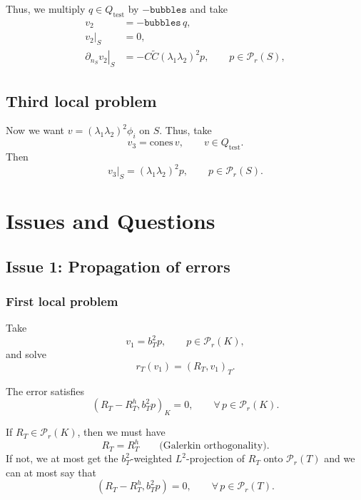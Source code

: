 \documentclass[12pt,a4paper]{article}
\newcommand{\PP}{\mathcal{P}}
\newcommand{\qtest}{Q_{\mathrm{test}}}
\newcommand{\cones}{\mathrm{cones}}
\newcommand{\bubbles}{\texttt{bubbles}}
\begin{document}
Thus, we multiply $q\in\qtest$ by $-\bubbles$ and take
\begin{align}
    v_2&=-\bubbles\,q,\\
    v_2|_S&=0,\\
    \left.\partial_{n_S}v_2\right|_S
       &= - C \tilde C(\lambda_1\lambda_2)^2p,
              \qquad p\in\PP_r(S),
\end{align}

\subsection{Third local problem}
Now we want $v=(\lambda_1\lambda_2)^2\phi_i$ on $S$.
Thus, take
\begin{equation}
    v_3=\cones\,v,
    \qquad v\in\qtest.
\end{equation}
Then
\begin{equation}
    v_3|_S=(\lambda_1\lambda_2)^2p,
        \qquad p\in\PP_r(S).
\end{equation}

\newpage
\section{Issues and Questions}
\subsection{Issue 1: Propagation of errors}

\subsubsection*{First local problem}
Take
\begin{equation}
    v_1=b_T^2p,\qquad p\in\PP_r(K),
\end{equation}
and solve
\begin{equation}
    r_T(v_1)=(R_T,v_1)_T.
\end{equation}

The error satisfies
\begin{equation}
    (R_T-R_T^h,b_T^2p)_K=0,
       \qquad \forall\,p\in\PP_r(K).
\end{equation}

If $R_T\in\PP_r(K)$, then we must have
\begin{equation}
    R_T=R_T^h\qquad\text{(Galerkin orthogonality)}.
\end{equation}
If not, we at most get the $b_T^2$-weighted $L^2$-projection of $R_T$ onto $\PP_r(T)$ and we can at most say that
\begin{equation}
    (R_T-R_T^h,b_T^2p)=0,
       \qquad \forall\,p\in\PP_r(T).
\end{equation}
\end{document}
